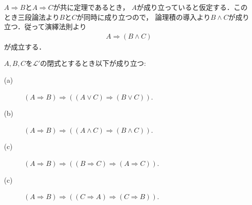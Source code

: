 	\begin{prf}
		$A \Longrightarrow B$と$A \Longrightarrow C$が共に定理であるとき，
		$A$が成り立っていると仮定する．このとき三段論法より$B$と$C$が同時に成り立つので，
		論理積の導入より$B \wedge C$が成り立つ．従って演繹法則より
		\begin{align}
			A \Longrightarrow (B \wedge C)
		\end{align}
		が成立する．
		\QED
	\end{prf}
	
	\begin{screen}
		\begin{metathm}[含意は遺伝する]\label{metathm:rule_of_inference_1}
			$A,B,C$を$\mathcal{L}'$の閉式とするとき以下が成り立つ:
			\begin{description}
				\item[(a)] $(A \Longrightarrow B) \Longrightarrow ( (A \vee C) \Longrightarrow (B \vee C) )$.
				
				\item[(b)] $(A \Longrightarrow B) \Longrightarrow ( (A \wedge C) \Longrightarrow (B \wedge C) )$.
				
				\item[(c)] $(A \Longrightarrow B) \Longrightarrow ( (B \Longrightarrow C) \Longrightarrow (A \Longrightarrow C) )$.
				
				\item[(c)] $(A \Longrightarrow B) \Longrightarrow ( (C \Longrightarrow A) \Longrightarrow (C \Longrightarrow B) )$.
			\end{description}
		\end{metathm}
	\end{screen}
	
